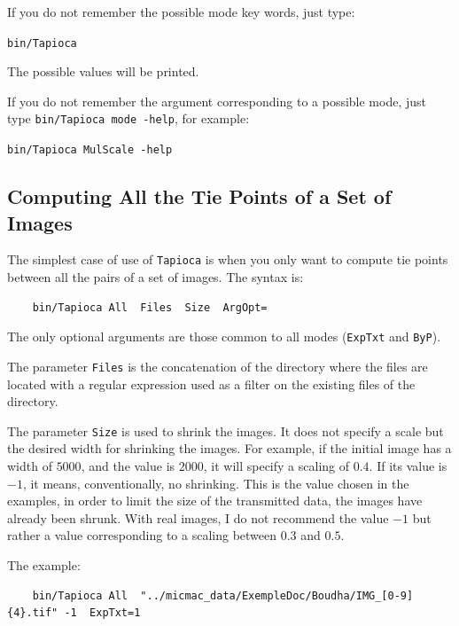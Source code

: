 If you do not remember the possible mode key words, just type: 

\begin{center}
        {\tt bin/Tapioca}
\end{center}

The possible values will be printed. 

If you do not remember the argument 
corresponding to a possible mode, just type {\tt bin/Tapioca mode -help},
for example:

\begin{center}
        {\tt bin/Tapioca MulScale -help}
\end{center}




\subsection{Computing All the Tie Points of a Set of Images}

The simplest case of use of {\tt Tapioca} is when you only want to compute tie points
between all the pairs of a set of images. The syntax is: 

{\scriptsize
\begin{verbatim}
    bin/Tapioca All  Files  Size  ArgOpt=
\end{verbatim}
}

The only optional arguments are those common to all modes ({\tt ExpTxt}  and {\tt ByP}).

The parameter {\tt Files} is the concatenation of the directory where the files
are located with a regular expression used as a filter on the existing files
of the directory.

The parameter {\tt Size} is used to shrink the images. It does not specify
a scale but the desired width for shrinking the images. For example, if the initial
image has a width of $5000$, and the value is $2000$, it will specify
a scaling of $0.4$. If its value is $-1$, it means, conventionally, no shrinking.
This is the value chosen in the examples, in order  to limit the size of the transmitted
data, the images have already been shrunk. With real images, I do not
recommend the value $-1$ but rather a value corresponding to a scaling
between $0.3$ and $0.5$.


The example:

{\scriptsize
\begin{verbatim}
    bin/Tapioca All  "../micmac_data/ExempleDoc/Boudha/IMG_[0-9]{4}.tif" -1  ExpTxt=1
\end{verbatim}
}


